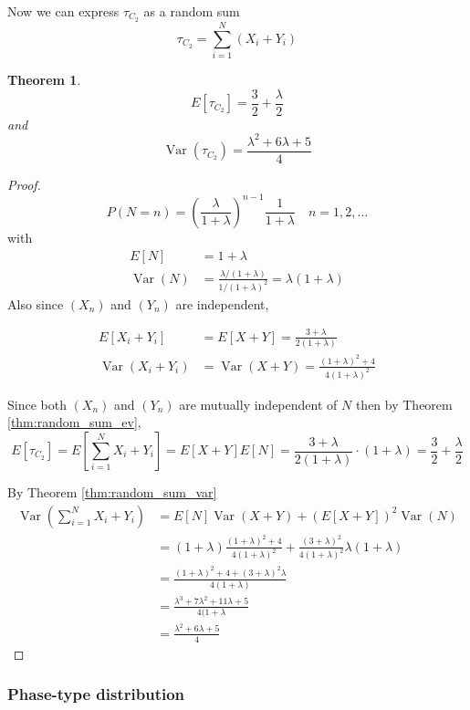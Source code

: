 \documentclass{article}
\theoremstyle{plain}
\newtheorem{theorem}{Theorem}[section]
\theoremstyle{definition}
\theoremstyle{remark}
\numberwithin{equation}{section}
\newcommand{\Var}{\operatorname {Var}}
\begin{document}
Now we can express $\tau_{C_2}$ as a random sum
$$
\tau_{C_2} = \sum_{i = 1}^N (X_i + Y_i)
$$

\begin{theorem}
$$
E[\tau_{C_2}] = \frac{3}{2} + \frac{\lambda}{2}
$$
and
$$
\Var(\tau_{C_2}) = \frac{\lambda^2 + 6 \lambda + 5}{4}
$$
\end{theorem}

\begin{proof}
$$
P(N = n) = \left(\frac{\lambda}{1 + \lambda} \right)^{n - 1} \frac{1}{1 + \lambda} \quad n = 1,2,\ldots
$$
with
\begin{align*}
    E[N] &= 1 + \lambda\\
    \Var(N) &= \frac{\lambda/(1 + \lambda)}{1/(1 + \lambda)^2} = \lambda (1 + \lambda)
\end{align*}
Also since $(X_n)$ and $(Y_n)$ are independent,

\begin{align*}
    E[X_i + Y_i] &= E[X + Y] = \frac{3 + \lambda}{2(1 + \lambda)}\\
    \Var(X_i + Y_i) &= \Var(X + Y) = \frac{(1 + \lambda)^2 + 4}{4(1 + \lambda)^2}
\end{align*}

Since both $(X_n)$ and $(Y_n)$ are mutually independent of $N$ then by Theorem \eqref{thm:random_sum_ev},
$$
E[\tau_{C_2}] = E\left[ \sum_{i = 1}^N X_i + Y_i \right] = E[X + Y] E[N] = \frac{3 + \lambda}{2(1 + \lambda)} \cdot (1 + \lambda) = \frac{3}{2} + \frac{\lambda}{2}
$$

By Theorem \ref{thm:random_sum_var}
\begin{align*}
    \Var\left( \sum_{i = 1}^N X_i + Y_i \right) &= E[N]\Var(X + Y) + (E[X + Y])^2 \Var(N)\\
    &= (1 + \lambda) \frac{(1 + \lambda)^2 + 4}{4(1 + \lambda)^2} + \frac{(3 + \lambda)^2}{4 (1 + \lambda)^2} \lambda (1 + \lambda)\\
    &= \frac{
        (1 + \lambda)^2 + 4 + (3 + \lambda)^2 \lambda
    }{4(1 + \lambda)}\\
    &= \frac{
    \lambda^3 + 7 \lambda^2 + 11 \lambda + 5
    }{4(1 + \lambda}\\
    &= \frac{\lambda^2 + 6 \lambda + 5}{4}
\end{align*}
\end{proof}

\subsubsection{Phase-type distribution}
\end{document}
